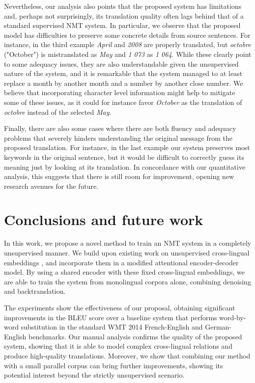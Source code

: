 \documentclass{article} \usepackage{iclr2018_conference,times}
\begin{document}
Nevertheless, our analysis also points that the proposed system has limitations and, perhaps not surprisingly, its translation quality often lags behind that of a standard supervised NMT system. In particular, we observe that the proposed model has difficulties to preserve some concrete details from source sentences. For instance, in the third example \textit{April} and \textit{2008} are properly translated, but \textit{octobre} ("October") is mistranslated as \textit{May} and \textit{1 073} as \textit{1 064}. While these clearly point to some adequacy issues, they are also understandable given the unsupervised nature of the system, and it is remarkable that the system managed to at least replace a month by another month and a number by another close number. We believe that incorporating character level information might help to mitigate some of these issues, as it could for instance favor \textit{October} as the translation of \textit{octobre} instead of the selected \textit{May}.

Finally, there are also some cases where there are both fluency and adequacy problems that severely hinders understanding the original message from the proposed translation. For instance, in the last example our system preserves most keywords in the original sentence, but it would be difficult to correctly guess its meaning just by looking at its translation. In concordance with our quantitative analysis, this suggests that there is still room for improvement, opening new research avenues for the future.


\section{Conclusions and future work} \label{sec:conclusions}

In this work, we propose a novel method to train an NMT system in a completely unsupervised manner. We build upon existing work on unsupervised cross-lingual embeddings \citep{artetxe2017learning,zhang2017adversarial},
and incorporate them in a modified attentional encoder-decoder model. By using a shared encoder with these fixed cross-lingual embeddings, we are able to train the system from monolingual corpora alone, combining denoising and backtranslation.

The experiments show the effectiveness of our proposal, obtaining significant improvements in the BLEU score over a baseline system that performs word-by-word substitution in the standard WMT 2014 French-English and German-English benchmarks. Our manual analysis confirms the quality of the proposed system, showing that it is able to model complex cross-lingual relations and produce high-quality translations. Moreover, we show that combining our method with a small parallel corpus can bring further improvements, showing its potential interest beyond the strictly unsupervised scenario.
\end{document}
